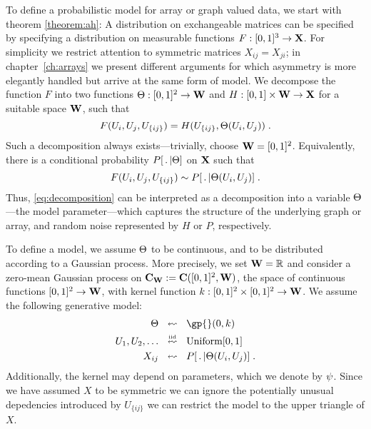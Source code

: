 To define a probabilistic model for array or graph valued data, we start with theorem \ref{theorem:ah}: A distribution on exchangeable matrices
can be specified by specifying a distribution on measurable functions $F : [0,1]^3\to\mathbf{X}$.
For simplicity we restrict attention to symmetric matrices $X_{ij} = X_{ji}$; in chapter~\ref{ch:arrays} we present different arguments for which asymmetry is more elegantly handled but arrive at the same form of model.
We decompose the function $F$ into two functions 
${\Theta:[0,1]^2\rightarrow\mathbf{W}}$ 
and ${H:[0,1]\times\mathbf{W}\rightarrow\mathbf{X}}$ for a suitable space $\mathbf{W}$, such that
\begin{equation}
  \label{eq:decomposition}
  F(U_i,U_j,U_{\{ij\}})=H(U_{\{ij\}},\Theta(U_i,U_j))\;.
\end{equation}
Such a decomposition always exists---trivially, choose $\mathbf{W}=[0,1]^2$.
Equivalently, there is a conditional probability $P[\,.\,|\Theta]$ on $\mathbf{X}$ such that
\begin{equation}
  \label{eq:decomposition:sampling}
  F(U_i,U_j,U_{\{ij\}})\sim P[\,.\,|\Theta(U_i,U_j)]\;.
\end{equation}
Thus, \eqref{eq:decomposition} can be interpreted as a decomposition into a variable $\Theta$---the model parameter---which captures the structure of the underlying graph or array,
and random noise represented by $H$ or $P$, respectively.

To define a model, we assume $\Theta$ to be continuous, and to be distributed according to a Gaussian process. More precisely,
we set ${\mathbf{W} = \mathbb{R}}$ and consider a zero-mean Gaussian process on 
$\mathbf{C}_{\mathbf{W}}:=\mathbf{C}([0,1]^2,\mathbf{W})$, the space of continuous functions $[0,1]^2\rightarrow\mathbf{W}$,
with kernel function 
${k:[0,1]^2\times[0,1]^2\rightarrow\mathbf{W}}$.
We assume the following generative model\footnotemark:
\begin{equation}
  \label{eq:model}
  \begin{split}
    \AHfunction\; &\probgets\; \gp{}(0,\kernel) \\
    \AHvar_{1},\AHvar_{2},\ldots\; &\probgetsiid\; \Uniform[0,1] \\
    \darray_{ij}\; &\probgets\; \likelihood[\,.\,|\AHfunction(U_i,U_j)] \;.
  \end{split}
\end{equation}
Additionally, the kernel may depend on parameters, which we denote by $\psi$.
Since we have assumed $X$ to be symmetric we can ignore the potentially unusual depedencies introduced by $U_{\{ij\}}$ \eg we can restrict the model to the upper triangle of $X$.

